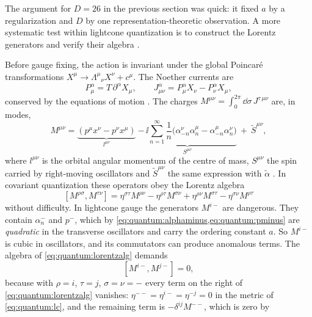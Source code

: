 The argument for $D=26$ in the previous section was quick: it fixed $a$ by a regularization
and $D$ by one representation-theoretic observation. A more systematic test within lightcone
quantization is to construct the Lorentz generators and verify their algebra
.

Before gauge fixing, the action is invariant under the global Poincar\'e transformations
$X^\mu\to\Lambda^\mu{}_\nu X^\nu+c^\mu$. The Noether currents are
\begin{equation}\label{eq:quantum:currents}
 P^\alpha_\mu=T\,\partial^\alpha X_\mu,\qquad
 J^\alpha_{\mu\nu}=P^\alpha_\mu X_\nu-P^\alpha_\nu X_\mu ,
\end{equation}
conserved by the equations of motion . The charges
$M^{\mu\nu}=\int_0^{2\pi}\dd\sigma\,J^{\tau\,\mu\nu}$ are, in modes,
\begin{equation}\label{eq:quantum:Mmunu}
 M^{\mu\nu}=\underbrace{(p^\mu x^\nu-p^\nu x^\mu)}_{l^{\mu\nu}}
  \ \underbrace{-\,\ii\sum_{n=1}^\infty\frac1n\big(\alpha^\nu_{-n}\alpha^\mu_n
      -\alpha^\mu_{-n}\alpha^\nu_n\big)}_{S^{\mu\nu}}
  \ +\ \tilde S^{\mu\nu},
\end{equation}
where $l^{\mu\nu}$ is the orbital angular momentum of the centre of mass, $S^{\mu\nu}$ the
spin carried by right-moving oscillators and $\tilde S^{\mu\nu}$ the same expression with
$\tilde\alpha$ . In covariant quantization these operators
obey the Lorentz algebra
\begin{equation}\label{eq:quantum:lorentzalg}
 [M^{\rho\sigma},M^{\tau\nu}]=\eta^{\sigma\tau}M^{\rho\nu}-\eta^{\rho\tau}M^{\sigma\nu}
   +\eta^{\rho\nu}M^{\sigma\tau}-\eta^{\sigma\nu}M^{\rho\tau}
\end{equation}
without difficulty. In lightcone gauge the generators $M^{i-}$ are dangerous. They contain
$\alpha^-_n$ and $p^-$, which by \cref{eq:quantum:alphaminus,eq:quantum:pminus} are
\emph{quadratic} in the transverse oscillators and carry the ordering constant $a$. So
$M^{i-}$ is cubic in oscillators, and its commutators can produce anomalous terms. The
algebra of \cref{eq:quantum:lorentzalg} demands
\begin{equation}\label{eq:quantum:smoking}
 [M^{i-},M^{j-}]=0 ,
\end{equation}
because with $\rho=i$, $\tau=j$, $\sigma=\nu=-$ every term on the right of
\cref{eq:quantum:lorentzalg} vanishes: $\eta^{--}=\eta^{i-}=\eta^{-j}=0$ in the metric
of \cref{eq:quantum:lc}, and the remaining term is $-\delta^{ij}M^{--}$, which is zero by
